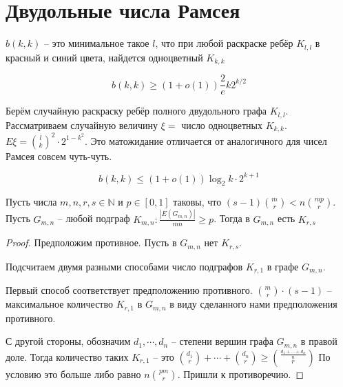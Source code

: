 \documentclass[document.tex]{subfiles}
\begin{document}
\section{Двудольные числа Рамсея}
\begin{definition}
    $b(k, k)$ -- это минимальное такое $l$, что при любой раскраске ребёр $K_{l, l}$ в красный и синий цвета, найдется
    одноцветный $K_{k, k}$ 
\end{definition}

\begin{theorem}
    \[
        b(k, k) \geq (1 + o(1))\frac{2}{e}k2^{k/2}
    \]
\end{theorem}

\begin{remark}
    Берём случайную раскраску ребёр полного двудольного графа $K_{l, l}$. Рассматриваем случайную величину $\xi = $
    число одноцветных $K_{k, k}$. $E \xi = \binom{l}{k}^2 \cdot 2^{1 - k^2}$. Это матожидание отличается от аналогичного
    для чисел Рамсея совсем чуть-чуть.
\end{remark}

\begin{theorem}[Конлон]
    \[
        b(k, k) \leq (1 + o(1))\log_2 k \cdot 2^{k+1}
    \]
\end{theorem}

\begin{lemma}
    Пусть числа $m, n, r, s \in \mathbb{N}$ и $p \in [0, 1]$ таковы, что $(s - 1) \binom{m}{r} < n \binom{mp}{r}$. Пусть
    $G_{m, n}$ -- любой подграф $K_{m, n}: \frac{|E(G_{m, n})|}{mn} \geq p$. Тогда в $G_{m, n}$ есть $K_{r, s}$
\end{lemma}

\begin{proof}
    Предположим противное. Пусть в $G_{m, n}$ нет $K_{r, s}$.

    Подсчитаем двумя разными способами число подграфов $K_{r, 1}$ в графе $G_{m, n}$.

    Первый способ соответствует предположению противного.
    $\binom{m}{r} \cdot (s - 1)$ -- максимальное количество $K_{r, 1}$ в $G_{m, n}$ в виду сделанного нами предположения
    противного.

    С другой стороны, обозначим $d_1, \cdots, d_n$ -- степени вершин графа $G_{m, n}$ в правой доле.
    Тогда количество таких $K_{r, 1}$ -- это 
    $\binom{d_1}{r} + \cdots + \binom{d_n}{r} \geq \binom{\frac{d_1 + \cdots + d_n}{n}}{r}$
    По условию это больше либо равно $n \binom{pm}{r}$. Пришли к противоречию.
\end{proof}
\end{document}
